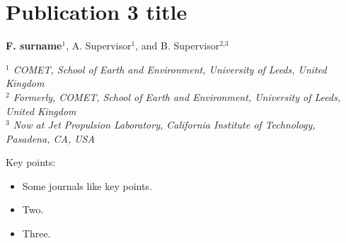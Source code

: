 \onehalfspacing
\chapter[Publication 3 title]{Publication 3 title}
\label{ch:publication3}
\begin{center}
 \large{\textbf{F. surname}$^{\text{1}}$, A. Supervisor$^{\text{1}}$, and B. Supervisor$^{\text{2,3}}$}  \\
\end{center}
\begin{center}
\textit{
$^{\text{1}}$ COMET, School of Earth and Environment, University of Leeds, United Kingdom\\
$^{\text{2}}$ Formerly, COMET, School of Earth and Environment, University of Leeds, United Kingdom\\
$^{\text{3}}$ Now at Jet Propulsion Laboratory, California Institute of Technology, Pasadena, CA, USA\\
}
\end{center}

\newpage
Key points:
\begin{itemize}
\item Some journals like key points.
\item Two.
\item Three.
\end{itemize}



